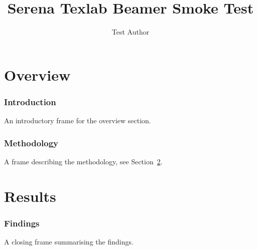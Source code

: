 \documentclass{beamer}
\title{Serena Texlab Beamer Smoke Test}
\author{Test Author}
\begin{document}
\frame{\titlepage}

\section{Overview}

\begin{frame}
\frametitle{Introduction}
\label{frame:intro}
An introductory frame for the overview section.
\end{frame}

\begin{frame}
\frametitle{Methodology}
\label{frame:method}
A frame describing the methodology, see Section~\ref{sec:results}.
\end{frame}

\section{Results}
\label{sec:results}

\begin{frame}
\frametitle{Findings}
A closing frame summarising the findings.
\end{frame}
\end{document}
